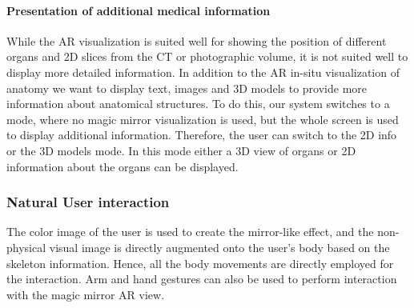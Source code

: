 {{{{\paragraph{Presentation of additional medical information}
While the AR visualization is suited well for showing the position of different organs and 2D slices from the CT or photographic volume, it is not suited well to display more detailed information. In addition to the AR in-situ visualization of anatomy we want to display text, images and 3D models to provide more information about anatomical structures. To do this, our system switches to a mode, where no magic mirror visualization is used, but the whole screen is used to display additional information. Therefore, the user can switch to the 2D info or the 3D models mode. In this mode either a 3D view of organs or 2D information about the organs can be displayed.

\subsubsection{Natural User interaction}
The color image of the user is used to create the mirror-like effect, and the non-physical visual image is directly augmented onto the user's body based on the skeleton information. Hence, all the body movements are directly employed for the interaction. Arm and hand gestures can also be used to perform interaction with the magic mirror AR view.

}}}}
